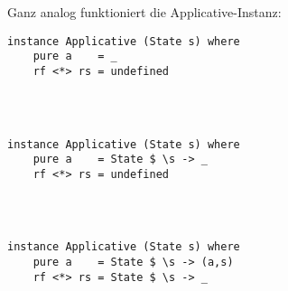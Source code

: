 \documentclass{beamer}
\begin{document}
\begin{frame}[fragile]
Ganz analog funktioniert die Applicative-Instanz:
\begin{overprint}
\begin{verbatim}
instance Applicative (State s) where
    pure a    = _
    rf <*> rs = undefined

    
    
\end{verbatim}
\begin{verbatim}
instance Applicative (State s) where
    pure a    = State $ \s -> _
    rf <*> rs = undefined

    
    
\end{verbatim}
\begin{verbatim}
instance Applicative (State s) where
    pure a    = State $ \s -> (a,s)
    rf <*> rs = State $ \s -> _

    
    

\end{verbatim}
\end{overprint}
\end{frame}
\end{document}
